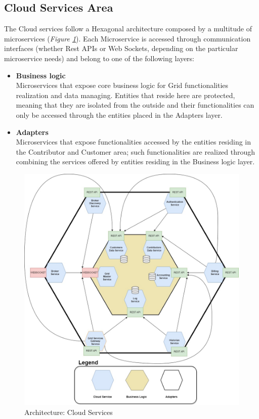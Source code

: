 \subsection{Cloud Services Area}\label{cloud_services_area}
The Cloud services follow a Hexagonal architecture composed by a multitude of microservices (\textit{Figure \ref{fig:architecture_cloud_services}}). Each Microservice is accessed through communication interfaces (whether Rest APIs or Web Sockets, depending on the particular microservice needs) and belong to one of the following layers:
\begin{itemize}
    \item \textbf{Business logic}\\
    Microservices that expose core business logic for Grid functionalities realization and data managing. Entities that  reside here are protected, meaning that they are isolated from the outside and their functionalities can only be accessed through the entities placed in the Adapters layer.
    \item \textbf{Adapters}\\
    Microservices that expose functionalities accessed by the entities residing in the Contributor and Customer area; such functionalities are realized through combining the services offered by entities residing in the Business logic layer.
\end{itemize}
\begin{figure}[!ht]
    \centering
    \includegraphics[scale=0.4]{document/chapters/chapter_6/images/architecture_cloud_services.jpg}
    \caption{Architecture: Cloud Services}
    \label{fig:architecture_cloud_services}
\end{figure}


